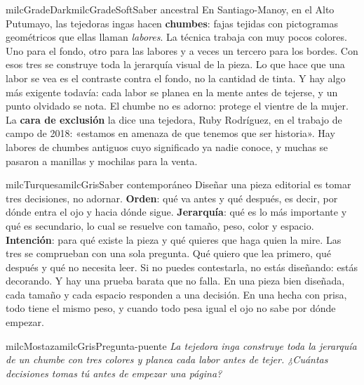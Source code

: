 \documentclass[11pt,letterpaper]{article}
\begin{document}
\begin{softbox}{milcGradeDark}{milcGradeSoft}{Saber ancestral}
En Santiago-Manoy, en el Alto Putumayo, las tejedoras ingas hacen \textbf{chumbes}: fajas tejidas con pictogramas geométricos que ellas llaman \emph{labores}. La técnica trabaja con muy pocos colores. Uno para el fondo, otro para las labores y a veces un tercero para los bordes. Con esos tres se construye toda la jerarquía visual de la pieza. Lo que hace que una labor se vea es el contraste contra el fondo, no la cantidad de tinta. Y hay algo más exigente todavía: cada labor se planea en la mente antes de tejerse, y un punto olvidado se nota. El chumbe no es adorno: protege el vientre de la mujer. La \textbf{cara de exclusión} la dice una tejedora, Ruby Rodríguez, en el trabajo de campo de 2018: «estamos en amenaza de que tenemos que ser historia». Hay labores de chumbes antiguos cuyo significado ya nadie conoce, y muchas se pasaron a manillas y mochilas para la venta.\par{}
\end{softbox}

\begin{softbox}{milcTurquesa}{milcGris}{Saber contemporáneo}
Diseñar una pieza editorial es tomar tres decisiones, no adornar. \textbf{Orden}: qué va antes y qué después, es decir, por dónde entra el ojo y hacia dónde sigue. \textbf{Jerarquía}: qué es lo más importante y qué es secundario, lo cual se resuelve con tamaño, peso, color y espacio. \textbf{Intención}: para qué existe la pieza y qué quieres que haga quien la mire. Las tres se comprueban con una sola pregunta. Qué quiero que lea primero, qué después y qué no necesita leer. Si no puedes contestarla, no estás diseñando: estás decorando. Y hay una prueba barata que no falla. En una pieza bien diseñada, cada tamaño y cada espacio responden a una decisión. En una hecha con prisa, todo tiene el mismo peso, y cuando todo pesa igual el ojo no sabe por dónde empezar.
\end{softbox}

\begin{softbox}{milcMostaza}{milcGris}{Pregunta-puente}
\textit{La tejedora inga construye toda la jerarquía de un chumbe con tres colores y planea cada labor antes de tejer. ¿Cuántas decisiones tomas tú antes de empezar una página?}
\end{softbox}
\end{document}
